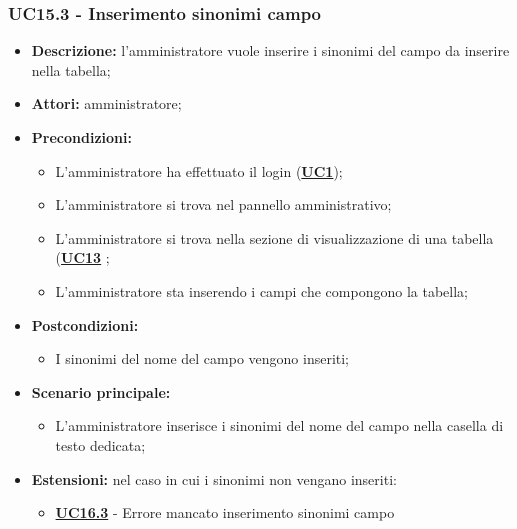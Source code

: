 \subsubsection{UC15.3 - Inserimento sinonimi campo}
\label{sec:UC15.3}
\begin{itemize}
	\item \textbf{Descrizione:} l’amministratore vuole inserire i sinonimi del campo da inserire nella tabella;
	\item \textbf{Attori:} amministratore;
	\item \textbf{Precondizioni:} 
	\begin{itemize}
		\item L’amministratore ha effettuato il login (\hyperref[sec:UC1]{\textbf{UC1}});
		\item L’amministratore si trova nel pannello amministrativo;
		\item L’amministratore si trova nella sezione di visualizzazione di una tabella (\hyperref[sec:UC13]{\textbf{UC13}} ;
		\item L’amministratore sta inserendo i campi che compongono la tabella;
	\end{itemize}
	\item \textbf{Postcondizioni:} 
	\begin{itemize}
		\item I sinonimi del nome del campo vengono inseriti;
	\end{itemize}
	\item \textbf{Scenario principale:} 
	\begin{itemize}
		\item L’amministratore inserisce i sinonimi del nome del campo nella casella di testo dedicata;
	\end{itemize}
	\item \textbf{Estensioni:} nel caso in cui i sinonimi non vengano inseriti:
	\begin{itemize}
		\item \hyperref[sec:UC16.3]{\textbf{UC16.3}} - Errore mancato inserimento sinonimi campo
	\end{itemize}
\end{itemize}

